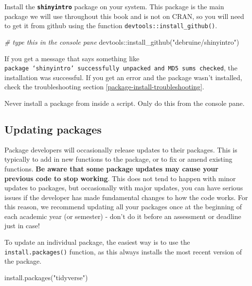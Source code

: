 \documentclass[
  oneside]{book}
\newenvironment{Shaded}{\begin{snugshade}}{\end{snugshade}}
\newcommand{\CommentTok}[1]{\textcolor[rgb]{0.56,0.35,0.01}{\textit{#1}}}
\newcommand{\FunctionTok}[1]{\textcolor[rgb]{0.00,0.00,0.00}{#1}}
\newcommand{\NormalTok}[1]{#1}
\newcommand{\SpecialCharTok}[1]{\textcolor[rgb]{0.00,0.00,0.00}{#1}}
\newcommand{\StringTok}[1]{\textcolor[rgb]{0.31,0.60,0.02}{#1}}
\begin{document}
Install the \textbf{\texttt{shinyintro}} package on your system. This package is the main package we will use throughout this book and is not on CRAN, so you will need to get it from github using the function \texttt{devtools::install\_github()}.

\begin{Shaded}
\begin{Highlighting}[]
\CommentTok{\# type this in the console pane}
\NormalTok{devtools}\SpecialCharTok{::}\FunctionTok{install\_github}\NormalTok{(}\StringTok{"debruine/shinyintro"}\NormalTok{)}
\end{Highlighting}
\end{Shaded}

If you get a message that says something like \texttt{package\ ‘shinyintro’\ successfully\ unpacked\ and\ MD5\ sums\ checked}, the installation was successful. If you get an error and the package wasn't installed, check the troubleshooting section \ref{package-install-troubleshooting}.

\begin{dangerous}
Never install a package from inside a script. Only do this from the console pane.

\end{dangerous}

\hypertarget{updating-packages}{%
\subsection{Updating packages}\label{updating-packages}}

Package developers will occasionally release updates to their packages. This is typically to add in new functions to the package, or to fix or amend existing functions. \textbf{Be aware that some package updates may cause your previous code to stop working}. This does not tend to happen with minor updates to packages, but occasionally with major updates, you can have serious issues if the developer has made fundamental changes to how the code works. For this reason, we recommend updating all your packages once at the beginning of each academic year (or semester) - don't do it before an assessment or deadline just in case!

To update an individual package, the easiest way is to use the \texttt{install.packages()} function, as this always installs the most recent version of the package.

\begin{Shaded}
\begin{Highlighting}[]
\FunctionTok{install.packages}\NormalTok{(}\StringTok{"tidyverse"}\NormalTok{)}
\end{Highlighting}
\end{Shaded}
\end{document}
